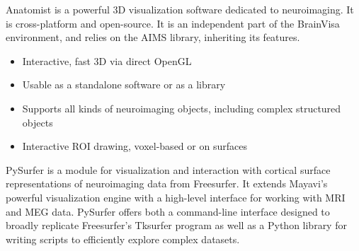 \begin{multicols}{3}


Anatomist is a powerful 3D visualization software dedicated to
neuroimaging.  It is cross-platform and open-source. It is an
independent part of the BrainVisa environment, and relies on the AIMS
library, inheriting its features.
\begin{itemize}[nolistsep,topsep=0em,leftmargin=1pc]
\item Interactive, fast 3D via direct OpenGL
\item Usable as a standalone software or as a library%
\item Supports all kinds of neuroimaging objects, including complex structured
objects
\item Interactive ROI drawing, voxel-based or on surfaces
\end{itemize}



PySurfer is a module for visualization and interaction with cortical
surface representations of neuroimaging data from Freesurfer. It
extends Mayavi’s powerful visualization engine with a high-level
interface for working with MRI and MEG data.  PySurfer offers both a
command-line interface designed to broadly replicate Freesurfer’s
Tksurfer program as well as a Python library for writing scripts to
efficiently explore complex datasets.


\end{multicols}


